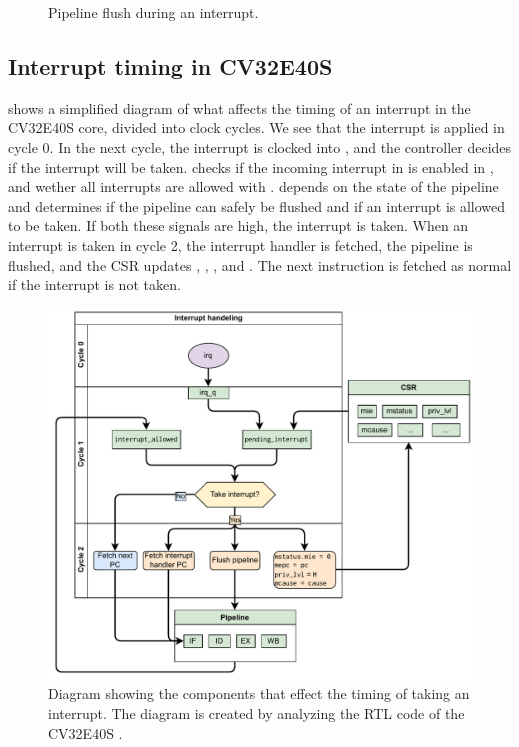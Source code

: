 \begin{figure}[htbp]
\centering

\caption{Pipeline flush during an interrupt.}
\label{fig:interrupt_flush}
\end{figure}



\subsection{Interrupt timing in CV32E40S}

 shows a simplified diagram of what affects the timing of an interrupt in the CV32E40S core, divided into clock cycles. We see that the interrupt is applied in cycle 0. In the next cycle, the interrupt is clocked into , and the controller decides if the interrupt will be taken.  checks if the incoming interrupt in  is enabled in , and wether all interrupts are allowed with .  depends on the state of the pipeline and determines if the pipeline can safely be flushed and if an interrupt is allowed to be taken. 
If both these signals are high, the interrupt is taken. When an interrupt is taken in cycle 2, the interrupt handler is fetched, the pipeline is flushed, and the CSR updates , , , and . The next instruction is fetched as normal if the interrupt is not taken.


\begin{figure}
    \centering
    \includegraphics[width=1\linewidth]{figures/interrupt_handeling_timing.pdf}
    \caption{Diagram showing the components that effect the timing of taking an interrupt. The diagram is created by analyzing the RTL code of the CV32E40S \cite{openhwgroupCv32e40s2024}.}
    \label{fig:interrupt_timing}
\end{figure}






